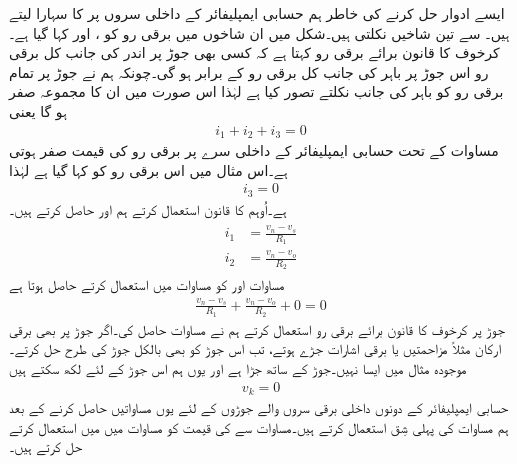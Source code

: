 ایسے  ادوار حل کرنے کی خاطر ہم حسابی ایمپلیفائر کے داخلی سروں پر   کا سہارا لیتے ہیں۔   سے تین شاخیں نکلتی ہیں۔شکل میں ان شاخوں میں برقی رو کو  ،  اور  کہا گیا ہے۔کرخوف کا قانون برائے برقی رو  کہتا ہے کہ کسی بھی جوڑ پر اندر کی جانب کل برقی رو اس جوڑ پر باہر کی جانب کل برقی رو کے برابر ہو گی۔چونکہ ہم نے جوڑ پر تمام برقی رو کو باہر کی جانب نکلتے تصور کیا ہے لہٰذا اس صورت میں ان کا مجموعہ صفر ہو گا یعنی
\begin{align} \label{مساوات_منفی_منفی_مداخل_کے_جوڑ_پر_رو}
i_1+i_2+i_3 = 0
\end{align}
مساوات   کے تحت حسابی ایمپلیفائر کے داخلی سرے پر برقی رو کی قیمت صفر ہوتی ہے۔اس مثال میں اس برقی رو کو  کہا گیا ہے لہٰذا
\begin{align} \label{مساوات_حسابی_منفی_سرے_پر_صفر_رو}
i_3=0
\end{align}
ہے۔اُوہم کا قانون استعمال کرتے ہم  اور  حاصل کرتے ہیں۔
\begin{gather} 
\begin{aligned}\label{مساوات_منفی_بقایا_داخلی_رو}
i_1& =\frac{v_n-v_s}{R_1}\\
i_2 &=\frac{v_n-v_o}{R_2}
\end{aligned}
\end{gather}
مساوات   اور   کو مساوات   میں استعمال کرتے حاصل ہوتا ہے
\begin{align} \label{مساوات_منفی_کا_حصول}
\frac{v_n - v_s}{R_1}+\frac{v_n-v_o}{R_2}+0=0
\end{align}
	جوڑ  پر کرخوف کا قانون برائے برقی رو استعمال کرتے ہم نے مساوات   حاصل کی۔اگر جوڑ  پر بھی برقی ارکان مثلاً مزاحمتیں یا برقی اشارات جڑے ہوتے، تب اس جوڑ کو بھی بالکل جوڑ  کی طرح حل کرتے۔موجودہ مثال میں ایسا نہیں۔جوڑ   کے ساتھ جڑا ہے اور یوں ہم اس جوڑ کے لئے لکھ سکتے ہیں
\begin{align} \label{مساوات_منفی_مثبت__زمین_پر}
v_k=0
\end{align}
	حسابی ایمپلیفائر کے دونوں داخلی برقی سروں والے جوڑوں کے لئے یوں مساواتیں حاصل کرنے کے بعد ہم مساوات   کی پہلی شِق استعمال کرتے ہیں۔مساوات   سے  کی قیمت کو مساوات   میں  میں استعمال کرتے حل کرتے ہیں۔

